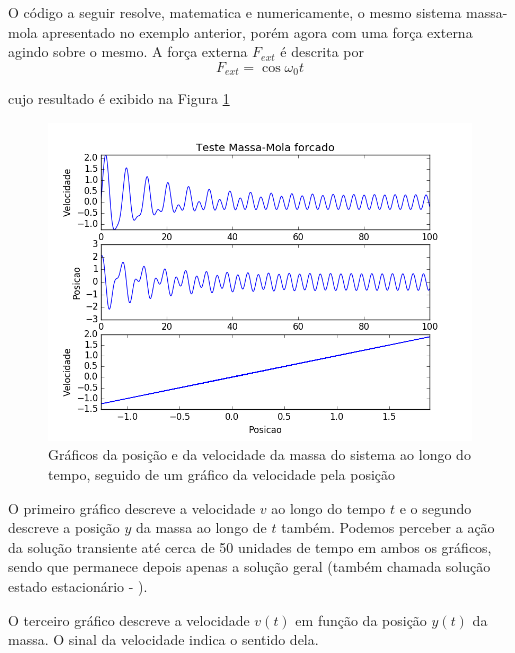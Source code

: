                 O código a seguir resolve, matematica e numericamente, o mesmo sistema massa-mola apresentado no exemplo anterior, porém agora com uma força externa agindo sobre o mesmo. A força externa $F_{ext}$ é descrita por
                \begin{equation*}
                    F_{ext} = \cos{\omega_0t}
                \end{equation*}
                
                cujo resultado é exibido na Figura \ref{fig:MMforcado}
                \begin{figure}[H]
                    \centering \includegraphics[scale=.54]{imagens/testeMassaMolaForcado.png}
                    \caption{Gráficos da posição e da velocidade da massa do sistema ao longo do tempo, seguido de um gráfico da velocidade pela posição}
                    \label{fig:MMforcado}
                \end{figure}
                
                O primeiro gráfico descreve a velocidade $v$ ao longo do tempo $t$ e o segundo descreve a posição $y$ da massa ao longo de $t$ também. Podemos perceber a ação da solução transiente até cerca de 50 unidades de tempo em ambos os gráficos, sendo que permanece depois apenas a solução geral (também chamada solução estado estacionário - \cite{boyce9}).
                
                O terceiro gráfico descreve a velocidade $v(t)$ em função da posição $y(t)$ da massa. O sinal da velocidade indica o sentido dela.
